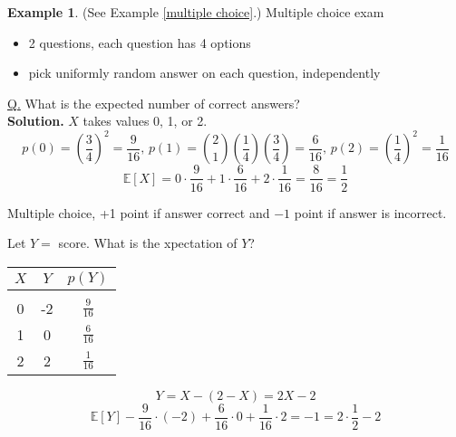 \documentclass[a4paper,11pt]{amsbook}
\theoremstyle{definition}
\newtheorem{example}{\hspace{-2em} \color{darkblue} Example}[chapter]
\theoremstyle{remark}
\newcommand{\E}{\mathbb{E}}
\newcommand\0{\varnothing}
\begin{document}
    \begin{example} (See Example \ref{multiple choice}.)
        Multiple choice exam
        \begin{itemize}
            \item 2 questions, each question has 4 options
            \item pick uniformly random answer on each question, independently
        \end{itemize}
        \underline{Q.} What is the expected number of correct answers?\\
        \textbf{Solution.} $X$ takes values 0, 1, or 2.
        $$p(0)=\left(\frac34\right)^2=\frac{9}{16},\,p(1)=\binom21\left(\frac14\right)\left(\frac34\right)=\frac{6}{16},\,p(2)=\left(\frac14\right)^2=\frac{1}{16}$$
        $$\E[X]=0\cdot\frac{9}{16}+1\cdot\frac{6}{16}+2\cdot\frac{1}{16}=\frac{8}{16}=\frac12$$

        Multiple choice, +1 point if answer correct and $-1$ point if answer is incorrect.

        Let $Y=$ score. What is the xpectation of $Y$?
        \begin{center}
            \begin{tabular}{c|c|c}
                $X$ & $Y$ & $p(Y)$ \\[5pt] \hline & & \\[-10pt]
                0 & -2 & $\frac{9}{16}$ \\[10pt]
                1 & 0 & $\frac{6}{16}$ \\[10pt]
                2 & 2 & $\frac{1}{16}$
            \end{tabular}
        \end{center}
        $$Y=X-(2-X)=2X-2$$
        $$\E[Y]-\frac{9}{16}\cdot(-2)+\frac{6}{16}\cdot0+\frac{1}{16}\cdot2=-1=2\cdot\frac{1}{2}-2$$
    \end{example}
\end{document}
